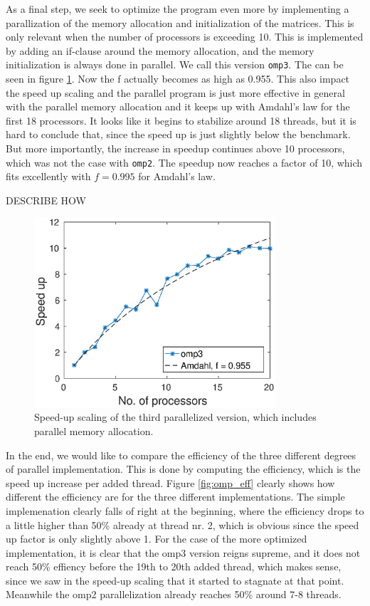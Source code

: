 As a final step, we seek to optimize the program even more by implementing a parallization of the memory allocation and initialization of the matrices. This is only relevant when the number of processors is exceeding 10. This is implemented by adding an if-clause around the memory allocation, and the memory initialization is always done in parallel. We call this version \texttt{omp3}. The can be seen in figure \ref{fig:omp3_scale}. Now the f actually becomes as high as 0.955. This also impact the speed up scaling and the parallel program is just more effective in general with the parallel memory allocation and it keeps up with Amdahl's law for the first 18 processors. It looks like it begins to stabilize around 18 threads, but it is hard to conclude that, since the speed up is just slightly below the benchmark. But more importantly, the increase in speedup continues above 10 processors, which was not the case with \texttt{omp2}. The speedup now reaches a factor of 10, which fits excellently with $f = 0.995$ for Amdahl's law.

\begin{huge}
DESCRIBE HOW
\end{huge}

\begin{figure}[h!]
\centering
\includegraphics[width = 0.8\textwidth]{fig/speedup_omp3.eps}
\caption{Speed-up scaling of the third parallelized version, which includes parallel memory allocation.}
\label{fig:omp3_scale}
\end{figure}


In the end, we would like to compare the efficiency of the three different degrees of parallel implementation. This is done by computing the efficiency, which is the speed up increase per added thread. Figure \ref{fig:omp_eff} clearly shows how different the efficiency are for the three different implementations. The simple implemenation clearly falls of right at the beginning, where the efficiency drops to a little higher than 50\% already at thread nr. 2, which is obvious since the speed up factor is only slightly above 1. For the case of the more optimized implementation, it is clear that the omp3 version reigns supreme, and it does not reach 50\% effiency before the 19th to 20th added thread, which makes sense, since we saw in the speed-up scaling that it started to stagnate at that point. Meanwhile the omp2 parallelization already reaches 50\% around 7-8 threads.

